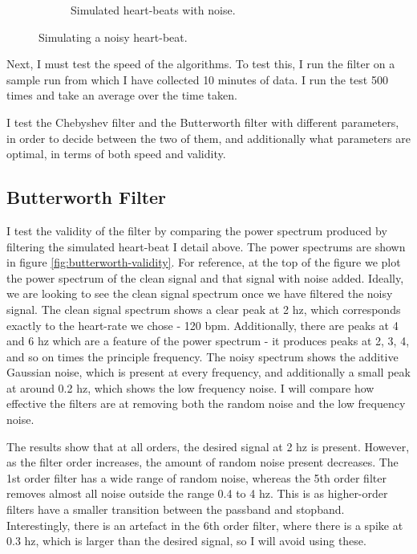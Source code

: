 \documentclass[12pt,a4paper,twoside,openany]{report}
\begin{document}
\begin{figure}[H]
\begin{subfigure}[b]{0.6\textwidth}
		\caption{Simulated heart-beats with noise.}
		\label{fig:sim-beats-noise}
	\end{subfigure}
	\caption{Simulating a noisy heart-beat.}
\end{figure}

Next, I must test the speed of the algorithms. To test this, I run the filter
on a sample run from which I have collected 10 minutes of data. I run the test
500 times and take an average over the time taken.

I test the Chebyshev filter and the Butterworth filter with different
parameters, in order to decide between the two of them, and additionally what
parameters are optimal, in terms of both speed and validity.

\subsection{Butterworth Filter}

I test the validity of the filter by comparing the power spectrum produced by
filtering the simulated heart-beat I detail above. The power spectrums are
shown in figure 
\ref{fig:butterworth-validity}. For reference, at the top of the figure we
plot the power spectrum of the clean signal and that signal with noise added.
Ideally, we are looking to see the clean signal spectrum once we have filtered the
noisy signal. The clean signal spectrum shows a clear peak at 2 hz, which
corresponds exactly to the heart-rate we chose - 120 bpm. Additionally, there
are peaks at 4 and 6 hz which are a feature of the power spectrum - it
produces peaks at 2, 3, 4, and so on times the principle frequency. The noisy
spectrum shows the additive Gaussian noise, which is present at every
frequency, and additionally a small peak at around 0.2 hz, which shows the low
frequency noise. I will compare how effective the filters are at removing both
the random noise and the low frequency noise.

The results show that at all orders, the desired signal at 2 hz is present.
However, as the filter order increases, the amount of random noise present
decreases. The 1st order filter has a wide range of random noise, whereas the
5th order filter removes almost all noise outside the range 0.4 to 4 hz. This
is as higher-order filters have a smaller transition between the passband and
stopband.
Interestingly, there is an artefact in the 6th order filter, where there is a
spike at 0.3 hz, which is larger than the desired signal, so I will avoid
using these. 
\end{document}
